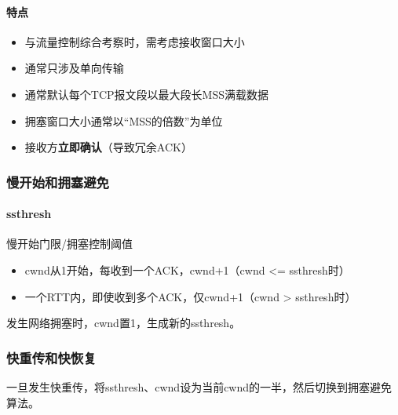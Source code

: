 \paragraph{特点}
\begin{itemize}
    \item 与流量控制综合考察时，需考虑接收窗口大小
    \item 通常只涉及单向传输
    \item 通常默认每个TCP报文段以最大段长MSS满载数据
    \item 拥塞窗口大小通常以“MSS的倍数”为单位
    \item 接收方\textbf{立即确认}（导致冗余ACK）
\end{itemize}


\subsubsection{慢开始和拥塞避免}

\paragraph{ssthresh}
慢开始门限/拥塞控制阈值

\begin{itemize}
    \item cwnd从1开始，每收到一个ACK，cwnd+1（cwnd <= ssthresh时）
    \item 一个RTT内，即使收到多个ACK，仅cwnd+1（cwnd > ssthresh时）
\end{itemize}

发生网络拥塞时，cwnd置1，生成新的ssthresh。


\subsubsection{快重传和快恢复}
一旦发生快重传，将ssthresh、cwnd设为当前cwnd的一半，然后切换到拥塞避免算法。






















